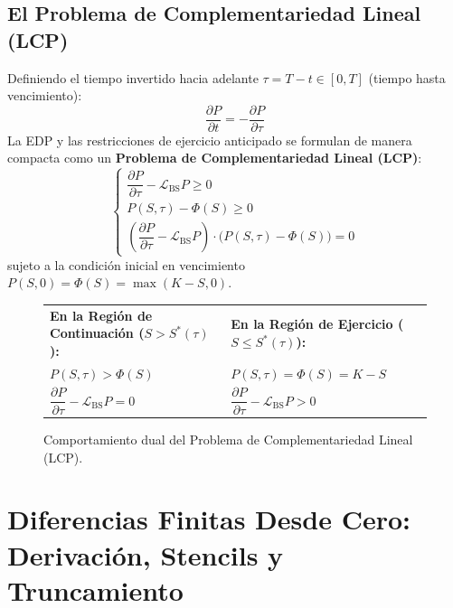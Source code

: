 \documentclass[11pt,a4paper]{article}
\begin{document}
\subsection{El Problema de Complementariedad Lineal (LCP)}
Definiendo el tiempo invertido hacia adelante $\tau = T - t \in [0, T]$ (tiempo hasta vencimiento):
\begin{equation}
    \frac{\partial P}{\partial t} = -\frac{\partial P}{\partial \tau}
\end{equation}
La EDP y las restricciones de ejercicio anticipado se formulan de manera compacta como un \textbf{Problema de Complementariedad Lineal (LCP)}:
\begin{equation}
    \label{eq:lcp}
    \begin{cases}
        \dfrac{\partial P}{\partial \tau} - \mathcal{L}_{\text{BS}} P \ge 0 \\[0.5em]
        P(S, \tau) - \Phi(S) \ge 0 \\[0.5em]
        \left( \dfrac{\partial P}{\partial \tau} - \mathcal{L}_{\text{BS}} P \right) \cdot \Big( P(S, \tau) - \Phi(S) \Big) = 0
    \end{cases}
\end{equation}
sujeto a la condición inicial en vencimiento $P(S, 0) = \Phi(S) = \max(K - S, 0)$.

\begin{figure}[htbp]
\centering
\begin{tabular}{|l|l|}
\hline
\textbf{En la Región de Continuación ($S > S^*(\tau)$):} & \textbf{En la Región de Ejercicio ($S \le S^*(\tau)$):} \\
$P(S, \tau) > \Phi(S)$ & $P(S, \tau) = \Phi(S) = K - S$ \\
$\dfrac{\partial P}{\partial \tau} - \mathcal{L}_{\text{BS}} P = 0$ & $\dfrac{\partial P}{\partial \tau} - \mathcal{L}_{\text{BS}} P > 0$ \\
\hline
\end{tabular}
\caption{Comportamiento dual del Problema de Complementariedad Lineal (LCP).}
\end{figure}

\newpage
\section{Diferencias Finitas Desde Cero: Derivación, Stencils y Truncamiento}
\end{document}
